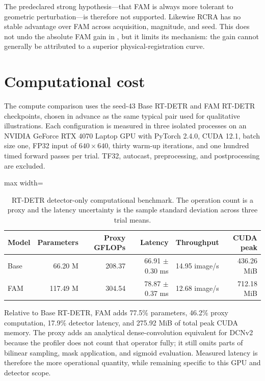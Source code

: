 The predeclared strong hypothesis---that FAM is always more tolerant to
geometric perturbation---is therefore not supported. Likewise RCRA has no
stable advantage over FAM across acquisition, magnitude, and seed. This does
not undo the absolute FAM gain in ,
but it limits its mechanism: the gain cannot generally be attributed to a
superior physical-registration curve.

\section{Computational cost}
\label{sec:compute}

The compute comparison uses the seed-43 Base RT-DETR and FAM RT-DETR
checkpoints, chosen in advance as the same typical pair used for qualitative
illustrations. Each
configuration is measured in three isolated processes on an NVIDIA GeForce RTX
4070 Laptop GPU with PyTorch 2.4.0, CUDA 12.1, batch size one, FP32 input of
\(640\times640\), thirty warm-up iterations, and one hundred timed forward
passes per trial. TF32, autocast, preprocessing, and postprocessing are
excluded.

\begin{table}[htbp]
  \centering
  \caption{RT-DETR detector-only computational benchmark. The operation count is a
  proxy and the latency uncertainty is the sample standard deviation across
  three trial means.}
  \label{tab:compute-results}
  \begin{adjustbox}{max width=\textwidth}
  \begin{tabular}{lrrrrr}
    \toprule
    Model & Parameters & Proxy GFLOPs & Latency & Throughput & CUDA peak \\
    \midrule
    Base & 66.20 M & 208.37 & 66.91 \(\pm\) 0.30 ms & 14.95 image/s & 436.26 MiB \\
    FAM & 117.49 M & 304.54 & 78.87 \(\pm\) 0.37 ms & 12.68 image/s & 712.18 MiB \\
    \bottomrule
  \end{tabular}
  \end{adjustbox}
\end{table}

Relative to Base RT-DETR, FAM adds 77.5\% parameters, 46.2\% proxy computation,
17.9\% detector latency, and 275.92 MiB of total peak CUDA memory. The proxy
adds an analytical dense-convolution equivalent for DCNv2 because the profiler
does not count that operator fully; it still omits parts of bilinear sampling,
mask application, and sigmoid evaluation. Measured latency is therefore the
more operational quantity, while remaining specific to this GPU and detector
scope.

